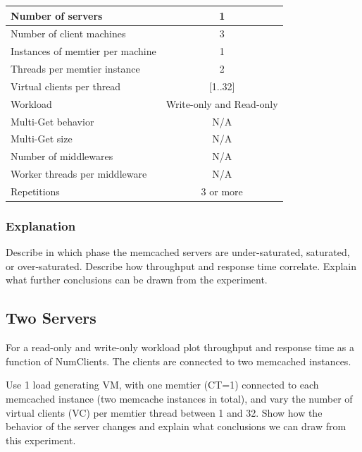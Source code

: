 \documentclass[11pt,a4paper]{article}
\begin{document}
\begin{center}
	\scriptsize{
		\begin{tabular}{|l|c|}
			\hline Number of servers                & 1                        \\
			\hline Number of client machines        & 3                        \\
			\hline Instances of memtier per machine & 1                        \\
			\hline Threads per memtier instance     & 2                        \\
			\hline Virtual clients per thread       & [1..32]                  \\
			\hline Workload                         & Write-only and Read-only \\
			\hline Multi-Get behavior               & N/A                      \\
			\hline Multi-Get size                   & N/A                      \\
			\hline Number of middlewares            & N/A                      \\
			\hline Worker threads per middleware    & N/A                      \\
			\hline Repetitions                      & 3 or more                \\
			\hline
		\end{tabular}
	}
\end{center}

\subsubsection{Explanation}

Describe in which phase the memcached servers are under-saturated, saturated, or over-saturated. Describe how throughput and response time correlate. Explain what further conclusions can be drawn from the experiment.


\subsection{Two Servers}

For a read-only and write-only workload plot throughput and response time as a function of NumClients. The clients are connected to two memcached instances.

Use 1 load generating VM, with one memtier (CT=1) connected to each memcached instance (two memcache instances in total), and vary the number of virtual clients (VC) per memtier thread between 1 and 32. Show how the behavior of the server changes and explain what conclusions we can draw from this experiment.
\end{document}
